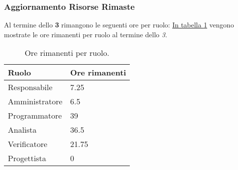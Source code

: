 \subsubsection{Aggiornamento Risorse Rimaste}
\label{sec:AggiornamentoRisorse_Sprint3}
Al termine dello \textbf{ 3} rimangono le seguenti ore per ruolo: \hyperref[tab:sprint3_ore_rimanenti]{In tabella \ref{tab:sprint3_ore_rimanenti}} vengono mostrate le ore rimanenti per ruolo al termine dello \textit{ 3}.

\begin{table}[H]
    \centering
    \begin{tabular}{| l | l |}
    \hline
    \textbf{Ruolo} & 
    \textbf{Ore rimanenti}\\
    \hline
        Responsabile & 7.25\\
    \hline
        Amministratore & 6.5\\
    \hline
        Programmatore & 39\\
    \hline
        Analista & 36.5\\
    \hline
        Verificatore & 21.75\\
    \hline
        Progettista & 0\\
    \hline
    \end{tabular}
    \caption{Ore rimanenti per ruolo.}
    \label{tab:sprint3_ore_rimanenti} 
\end{table}